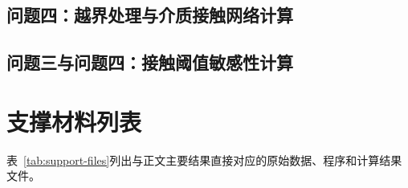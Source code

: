 \documentclass[withoutpreface,bwprint]{cumcmthesis}
\begin{document}
\subsection{问题四：越界处理与介质接触网络计算}




\subsection{问题三与问题四：接触阈值敏感性计算}


\section{支撑材料列表}
\label{app:support-files}

表~\ref{tab:support-files}列出与正文主要结果直接对应的原始数据、程序和计算结果文件。
\end{document}

